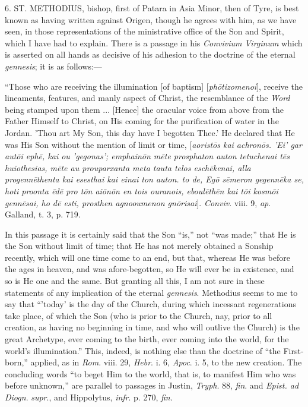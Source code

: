 6. ST. METHODIUS,
bishop, first of Patara in Asia Minor, then of Tyre, is best
known as having written against Origen, though he agrees with him, as
we have seen, in those representations of the ministrative office of
the Son and Spirit, which I have had to explain. There is a passage in
his \emph{Convivium Virginum} which is asserted on all hands as
decisive of his adhesion to the doctrine of the eternal \emph{gennesis};
it is as follows:—

``Those who are receiving the illumination [of baptism] [\emph{ph\={o}tizomenoi}],
receive the lineaments, features, and manly aspect of Christ, the
resemblance of the \emph{Word} being stamped upon them ... [Hence] the
oracular voice from above from the Father Himself to Christ, on His
coming for the purification of water in the Jordan. 'Thou art My Son,
this day have I begotten Thee.' He declared that He was His Son
without the mention of limit or time, [\emph{aorist\={o}s kai achron\={o}s.
'Ei'
gar aut\={o}i eph\={e}, kai ou 'gegonas'; emphain\={o}n m\={e}te
prosphaton auton tetuchenai t\={e}s huiothesias, m\={e}te au
prouparxanta meta tauta telos esch\={e}kenai, alla progenn\={e}thenta
kai esesthai kai einai ton auton. to de, Eg\={o} s\={e}meron gegenn\={e}ka
se, hoti proonta \={e}d\={e} pro t\={o}n ai\={o}n\={o}n
en tois ouranois, eboul\={e}th\={e}n kai t\={o}i kosm\={o}i
genn\={e}sai, ho d\={e} esti, prosthen agnooumenon gn\={o}risai}].
\emph{Conviv}. viii. 9, \emph{ap}. Galland, t. 3, p. 719.

In this passage it is certainly said that the Son ``is,''
not ``was made;'' that He is the Son without limit of time;
that He has not merely obtained a Sonship recently, which will one
time come to an end, but that, whereas He was before the ages in
heaven, and was afore-begotten, so He will ever be in existence, and
so is He one and the same. But granting all this, I am not sure in
these statements of any implication of the eternal \emph{gennesis}.
Methodius seems to me to say that ``'today' is the day of the
Church, during which incessant regenerations take place, of which the
Son (who is prior to the Church, nay, prior to all creation, as having
no beginning in time, and who will outlive the Church) is the great
Archetype, ever coming to the birth, ever coming into the world, for
the world's illumination.'' This, indeed, is nothing else than the
doctrine of ``the First-born,'' applied, as in \emph{Rom}.
viii. 29, \emph{Hebr}. i. 6, \emph{Apoc}. i. 5, to the new creation.
The concluding words ``to beget Him to the world, that is, to
manifest Him who was before unknown,'' are parallel to passages in
Justin, \emph{Tryph}. 88, \emph{fin}. and \emph{Epist. ad Diogn}. \emph{supr}.,
and Hippolytus, \emph{infr}. p. 270, \emph{fin}.

